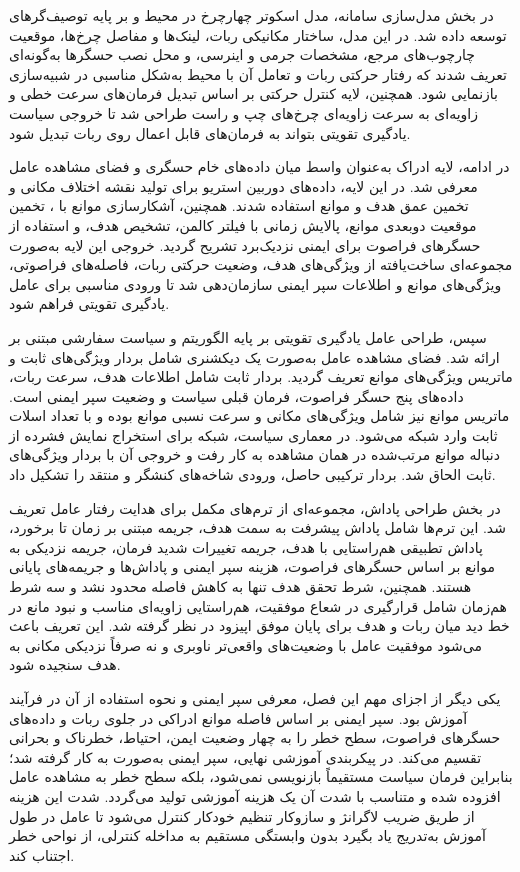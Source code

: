در بخش مدل‌سازی سامانه، مدل اسکوتر چهارچرخ در محیط  و بر پایه توصیف‌گرهای  توسعه داده شد. در این مدل، ساختار مکانیکی ربات، لینک‌ها و مفاصل چرخ‌ها، موقعیت چارچوب‌های مرجع، مشخصات جرمی و اینرسی، و محل نصب حسگرها به‌گونه‌ای تعریف شدند که رفتار حرکتی ربات و تعامل آن با محیط به‌شکل مناسبی در شبیه‌سازی بازنمایی شود. همچنین، لایه کنترل حرکتی بر اساس تبدیل فرمان‌های سرعت خطی و زاویه‌ای به سرعت زاویه‌ای چرخ‌های چپ و راست طراحی شد تا خروجی سیاست یادگیری تقویتی بتواند به فرمان‌های قابل اعمال روی ربات تبدیل شود.

در ادامه، لایه ادراک به‌عنوان واسط میان داده‌های خام حسگری و فضای مشاهده عامل معرفی شد. در این لایه، داده‌های دوربین استریو برای تولید نقشه اختلاف مکانی و تخمین عمق هدف و موانع استفاده شدند. همچنین، آشکارسازی موانع با ، تخمین موقعیت دوبعدی موانع، پالایش زمانی با فیلتر کالمن، تشخیص هدف، و استفاده از حسگرهای فراصوت برای ایمنی نزدیک‌برد تشریح گردید. خروجی این لایه به‌صورت مجموعه‌ای ساخت‌یافته از ویژگی‌های هدف، وضعیت حرکتی ربات، فاصله‌های فراصوتی، ویژگی‌های موانع و اطلاعات سپر ایمنی سازمان‌دهی شد تا ورودی مناسبی برای عامل یادگیری تقویتی فراهم شود.

سپس، طراحی عامل یادگیری تقویتی بر پایه الگوریتم  و سیاست سفارشی مبتنی بر  ارائه شد. فضای مشاهده عامل به‌صورت یک دیکشنری شامل بردار ویژگی‌های ثابت و ماتریس ویژگی‌های موانع تعریف گردید. بردار ثابت شامل اطلاعات هدف، سرعت ربات، داده‌های پنج حسگر فراصوت، فرمان قبلی سیاست و وضعیت سپر ایمنی است. ماتریس موانع نیز شامل ویژگی‌های مکانی و سرعت نسبی موانع بوده و با تعداد اسلات ثابت وارد شبکه می‌شود. در معماری سیاست، شبکه  برای استخراج نمایش فشرده از دنباله موانع مرتب‌شده در همان مشاهده به کار رفت و خروجی آن با بردار ویژگی‌های ثابت الحاق شد. بردار ترکیبی حاصل، ورودی شاخه‌های کنشگر و منتقد  را تشکیل داد.

در بخش طراحی پاداش، مجموعه‌ای از ترم‌های مکمل برای هدایت رفتار عامل تعریف شد. این ترم‌ها شامل پاداش پیشرفت به سمت هدف، جریمه مبتنی بر زمان تا برخورد، پاداش تطبیقی هم‌راستایی با هدف، جریمه تغییرات شدید فرمان، جریمه نزدیکی به موانع بر اساس حسگرهای فراصوت، هزینه سپر ایمنی و پاداش‌ها و جریمه‌های پایانی هستند. همچنین، شرط تحقق هدف تنها به کاهش فاصله محدود نشد و سه شرط هم‌زمان شامل قرارگیری در شعاع موفقیت، هم‌راستایی زاویه‌ای مناسب و نبود مانع در خط دید میان ربات و هدف برای پایان موفق اپیزود در نظر گرفته شد. این تعریف باعث می‌شود موفقیت عامل با وضعیت‌های واقعی‌تر ناوبری و نه صرفاً نزدیکی مکانی به هدف سنجیده شود.

یکی دیگر از اجزای مهم این فصل، معرفی سپر ایمنی و نحوه استفاده از آن در فرآیند آموزش بود. سپر ایمنی بر اساس فاصله موانع ادراکی در جلوی ربات و داده‌های حسگرهای فراصوت، سطح خطر را به چهار وضعیت ایمن، احتیاط، خطرناک و بحرانی تقسیم می‌کند. در پیکربندی آموزشی نهایی، سپر ایمنی به‌صورت  به کار گرفته شد؛ بنابراین فرمان سیاست مستقیماً بازنویسی نمی‌شود، بلکه سطح خطر به مشاهده عامل افزوده شده و متناسب با شدت آن یک هزینه آموزشی تولید می‌گردد. شدت این هزینه از طریق ضریب لاگرانژ و سازوکار تنظیم خودکار کنترل می‌شود تا عامل در طول آموزش به‌تدریج یاد بگیرد بدون وابستگی مستقیم به مداخله کنترلی، از نواحی خطر اجتناب کند.

